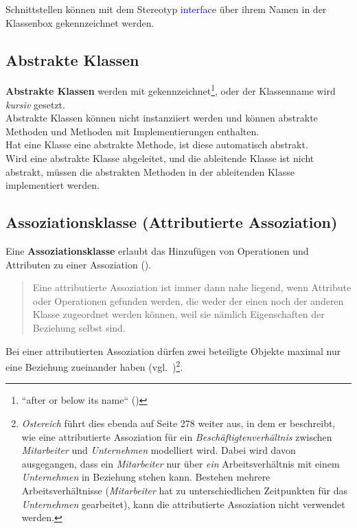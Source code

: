 \noindent
Schnittstellen können mit dem Stereotyp \textcolor{blue}{\guillemotleft interface\guillemotright} über ihrem Namen in der Klassenbox gekennzeichnet werden.

\subsection{Abstrakte Klassen}
\textbf{Abstrakte Klassen} werden mit  gekennzeichnet\footnote{
``after or below its name`` (\cite[101]{OMG17})
}, oder der Klassenname wird \textit{kursiv} gesetzt.\\
Abstrakte Klassen können nicht instanziiert werden und können abstrakte Methoden und Methoden mit Implementierungen enthalten.\\
Hat eine Klasse eine abstrakte Methode, ist diese automatisch abstrakt.\\
Wird eine abstrakte Klasse abgeleitet, und die ableitende Klasse ist nicht abstrakt, müssen die abstrakten Methoden in der ableitenden Klasse implementiert werden.

\subsection{Assoziationsklasse (Attributierte Assoziation)}
Eine \textbf{Assoziationsklasse} erlaubt das Hinzufügen von Operationen und Attributen zu einer Assoziation (\cite[43]{Buh09}).

\blockquote[{\cite[277]{Oes05}}]{
Eine attributierte Assoziation ist immer dann nahe liegend, wenn Attribute oder Operationen gefunden werden, die weder der einen noch der anderen Klasse zugeordnet werden können, weil sie nämlich Eigenschaften der Beziehung selbst sind.
}.

\begin{tcolorbox}
Bei einer attributierten Assoziation dürfen zwei beteiligte Objekte maximal nur eine Beziehung zueinander haben (vgl.~\cite[277]{Oes05})\footnote{
\textit{Ostereich} führt dies ebenda auf Seite 278 weiter aus, in dem er beschreibt, wie eine attributierte Assoziation für ein \textit{Beschäftigtenverhältnis} zwischen \textit{Mitarbeiter} und \textit{Unternehmen} modelliert wird. Dabei wird davon ausgegangen, dass ein \textit{Mitarbeiter} nur über \textit{ein} Arbeitsverhältnis mit einem \textit{Unternehmen} in Beziehung stehen kann. Bestehen mehrere Arbeitsverhältnisse (\textit{Mitarbeiter} hat zu unterschiedlichen Zeitpunkten für das \textit{Unternehmen} gearbeitet), kann die attributierte Assoziation nicht verwendet werden.
}.
\end{tcolorbox}

